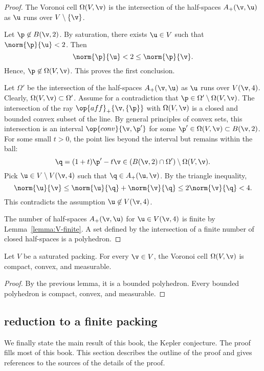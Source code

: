 \begin{proof} 
The Voronoi cell $\Omega(V,\v)$ is the
intersection of the half-spaces $A_+(\v,\u)$ as $\u$ runs over
$V\setminus \{\v\}$.

Let $\p\not\in B(\v,2)$.  
By saturation, there exists $\u\in V$ such that $\norm{\p}{\u}<2$.
Then 
\[  
\norm{\p}{\u} < 2 \le \norm{\p}{\v}.
\] 
Hence, $\p\not\in\Omega(V,\v)$.  This proves the first conclusion.


Let $\Omega'$ be the intersection of the half-spaces $A_+(\v,\u)$ as
$\u$ runs over $V(\v,4)$.  Clearly, $\Omega(V,\v)\subset \Omega'$.
Assume for a contradiction that $\p\in \Omega'\setminus\Omega(V,\v)$.
The intersection of the ray $\op{aff}_+\{\v,\{\p\}\}$ with
$\Omega(V,\v)$ is a closed and bounded convex subset of the line.  By
general principles of convex sets, this intersection is an interval
$\op{conv}\{\v,\p'\}$ for some $\p'\in\Omega(V,\v)\subset B(\v,2)$.
For some small $t>0$, the point lies beyond the interval but remains
within the ball:
\[  
\q = (1+t)\p' -t \v\in (B(\v,2)\cap \Omega')\setminus \Omega(V,\v).
\] 
Pick $\u\in V\setminus V(\v,4)$ such that $\q\in A_+(\u,\v)$.  By the
triangle inequality,
\[  
\norm{\u}{\v} \le \norm{\u}{\q} + \norm{\v}{\q} \le 2\norm{\v}{\q} < 4.
\] 
This contradicts the assumption $\u\not\in V(\v,4)$.

The number of half-spaces $A_+(\v,\u)$ for $\u\in V(\v,4)$ is finite by
Lemma~\ref{lemma:V-finite}.  A set defined by the intersection of a finite number
of closed half-spaces is a polyhedron.
\end{proof}

\begin{lemma}
Let $ V$ be a saturated packing.  For every $\v\in  V$, 
the Voronoi cell $\Omega( V,\v)$  is
compact, convex, and measurable.
\end{lemma}

\begin{proof} By the previous lemma, it is a bounded polyhedron.
  Every bounded polyhedron is compact, convex, and measurable.
\end{proof}




\subsection{reduction to a finite packing}

We finally state the main result of this book, the Kepler conjecture.
The proof fills most of this book. This section describes the
outline of the proof and gives references to the sources of the
details of the proof.


